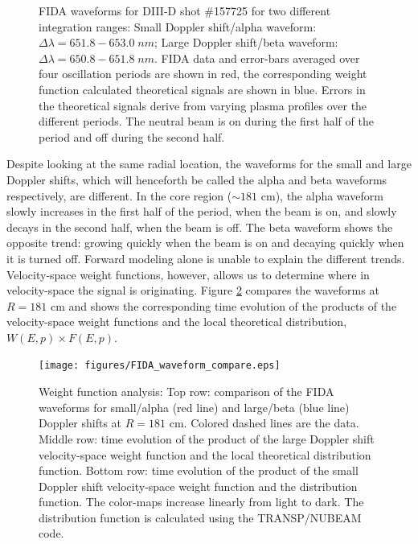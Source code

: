 \begin{figure}[ht]
    \caption{FIDA waveforms for DIII-D shot \#157725 for two different integration ranges:
         Small Doppler shift/alpha waveform: $\Delta \lambda = 651.8-653.0\;nm$;
         Large Doppler shift/beta waveform: $\Delta \lambda = 650.8-651.8\;nm$.
        FIDA data and error-bars averaged over four oscillation periods are shown in red, the corresponding weight function calculated theoretical signals are shown in blue. Errors in the theoretical signals derive from varying plasma profiles over the different periods. The neutral beam is on during the first half of the period and off during the second half.}
    \label{fig:fida_waveform}
\end{figure}

Despite looking at the same radial location, the waveforms for the small and large Doppler shifts, which will henceforth be called the alpha and beta waveforms respectively, are different. In the core region ($\sim181$ cm), the alpha waveform slowly increases in the first half of the period, when the beam is on, and slowly decays in the second half, when the beam is off. The beta waveform shows the opposite trend: growing quickly when the beam is on and decaying quickly when it is turned off. Forward modeling alone is unable to explain the different trends. Velocity-space weight functions, however, allows us to determine where in velocity-space the signal is originating. Figure \ref{fig:fida_waveform_WF} compares the waveforms at $R=181$ cm and shows the corresponding time evolution of the products of the velocity-space weight functions and the local theoretical distribution, $W(E,p)\times F(E,p)$.
\begin{figure}[h!]
    \centering
    \texttt{[image: figures/FIDA\_waveform\_compare.eps]}
    \caption{Weight function analysis: Top row: comparison of the FIDA waveforms for small/alpha (red line) and large/beta (blue line) Doppler shifts at $R=181$ cm. Colored dashed lines are the data. Middle row: time evolution of the product of the large Doppler shift velocity-space weight function and the local theoretical distribution function. Bottom row: time evolution of the product of the small Doppler shift velocity-space weight function and the distribution function. The color-maps increase linearly from light to dark. The distribution function is calculated using the TRANSP/NUBEAM\cite{NUBEAM} code.}
    \label{fig:fida_waveform_WF}
\end{figure}
